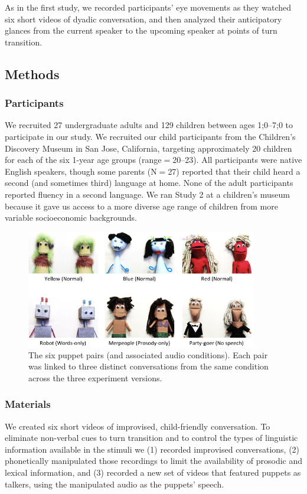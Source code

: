 \documentclass[authoryear, 12pt]{elsarticle}
\begin{document}
As in the first study, we recorded participants' eye movements as they watched six short videos of dyadic conversation, and then analyzed their anticipatory glances from the current speaker to the upcoming speaker at points of turn transition.

\subsection{Methods}
\label{sec:methods2}

\subsubsection{Participants}
We recruited 27 undergraduate adults and 129 children between ages 1;0--7;0 to participate in our study. We recruited our child participants from the Children's Discovery Museum in San Jose, California, targeting approximately 20 children for each of the six 1-year age groups (range$=$20--23). All participants were native English speakers, though some parents (N$=$27) reported that their child heard a second (and sometimes third) language at home. None of the adult participants reported fluency in a second language. We ran Study 2 at a children's museum because it gave us access to a more diverse age range of children from more variable socioeconomic backgrounds.

\begin{figure}[ht]
\begin{center}
\includegraphics[width=0.9\textwidth]{figures/FIG-EN-stim.png}
\end{center}
\caption{The six puppet pairs (and associated audio conditions). Each pair was linked to three distinct conversations from the same condition across the three experiment versions.}
\label{puppets}
\end{figure}

\subsubsection{Materials}
We created six short videos of improvised, child-friendly conversation. To eliminate non-verbal cues to turn transition and to control the types of linguistic information available in the stimuli we (1) recorded improvised conversations, (2) phonetically manipulated those recordings to limit the availability of prosodic and lexical information, and (3) recorded a new set of videos that featured puppets as talkers, using the manipulated audio as the puppets' speech.
\end{document}
